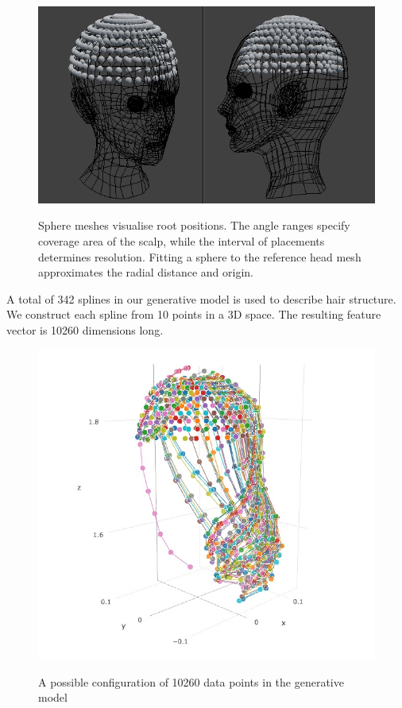 \documentclass[ %
author={Dillon Keith Diep},
supervisor={Dr. Carl Henrik Ek},
degree={MEng},
title={ART-CG:},
subtitle={Assisted Real-time Content Generation of 3D Hair by Learning Manifolds},
type={Research},
year={2017} ]{dissertation}
\begin{document}
\begin{figure}[!h]
	\centering
	\caption{Sphere meshes visualise root positions. The angle ranges specify coverage area of the scalp, while the interval of placements determines resolution. Fitting a sphere to the reference head mesh approximates the radial distance and origin.}
	\includegraphics[scale=0.5]{images/spherePoints}\\
\end{figure}

A total of 342 splines in our generative model is used to describe hair structure. We construct each spline from 10 points in a 3D space. The resulting feature vector is 10260 dimensions long.

\begin{figure}[!h]
	\centering
	\includegraphics[scale=3]{images/generativeModel}\\
	\caption{A possible configuration of 10260 data points in the generative model}
\end{figure}
\end{document}
